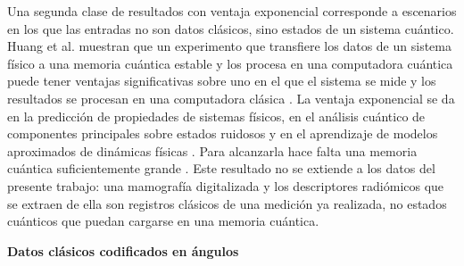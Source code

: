 Una segunda clase de resultados con ventaja exponencial corresponde a escenarios en los que las entradas no son datos clásicos, sino estados de un sistema cuántico.
Huang et al. muestran que un experimento que transfiere los datos de un sistema físico a una memoria cuántica estable y los procesa en una computadora cuántica puede tener ventajas significativas sobre uno en el que el sistema se mide y los resultados se procesan en una computadora clásica \cite{Huang2022Experiments}.
La ventaja exponencial se da en la predicción de propiedades de sistemas físicos, en el análisis cuántico de componentes principales sobre estados ruidosos y en el aprendizaje de modelos aproximados de dinámicas físicas \cite{Huang2022Experiments}.
Para alcanzarla hace falta una memoria cuántica suficientemente grande \cite{Huang2022Experiments}. Este resultado no se extiende a los datos del presente trabajo: una mamografía digitalizada y los descriptores radiómicos que se extraen de ella son registros clásicos de una medición ya realizada, no estados cuánticos que puedan cargarse en una memoria cuántica.

\textbf{Datos clásicos codificados en ángulos}

